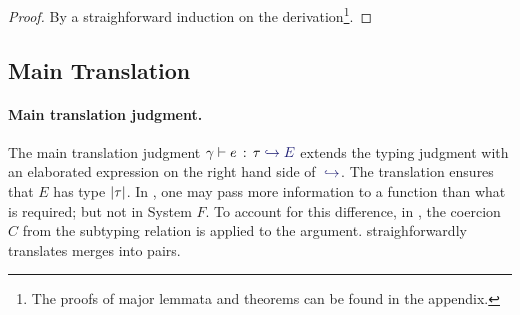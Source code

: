 \begin{proof}
  By a straighforward induction on the derivation\footnote{The proofs of major lemmata and theorems can be found in the appendix.}.
\end{proof}

\subsection{Main Translation}

\begin{comment}
In this subsection we now present formally the translation rules that convert
\name expressions into System $ F $ ones. This set of rules essentially extends
those in the previous section with the light-blue part for the translation.
\end{comment}


\paragraph{Main translation judgment.} The main translation judgment
$\hastype \gamma e \tau \yields E$ extends the typing judgment with an elaborated
expression on the right hand side of $\yields {}$. The translation ensures
that $E$ has type $\lvert \tau \rvert$. In \name, one may pass more information to a
function than what is required; but not in System $F$. To account for this
difference, in , the coercion $C$ from the subtyping relation is
applied to the argument.  straighforwardly translates merges
into pairs.





